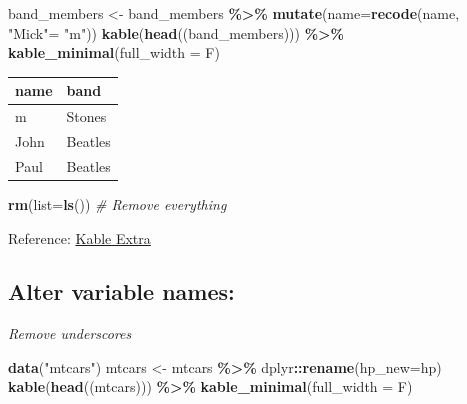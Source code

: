 \documentclass[
]{article}
\newenvironment{Shaded}{\begin{snugshade}}{\end{snugshade}}
\newcommand{\AttributeTok}[1]{\textcolor[rgb]{0.13,0.29,0.53}{#1}}
\newcommand{\CommentTok}[1]{\textcolor[rgb]{0.56,0.35,0.01}{\textit{#1}}}
\newcommand{\FunctionTok}[1]{\textcolor[rgb]{0.13,0.29,0.53}{\textbf{#1}}}
\newcommand{\NormalTok}[1]{#1}
\newcommand{\OtherTok}[1]{\textcolor[rgb]{0.56,0.35,0.01}{#1}}
\newcommand{\SpecialCharTok}[1]{\textcolor[rgb]{0.81,0.36,0.00}{\textbf{#1}}}
\newcommand{\StringTok}[1]{\textcolor[rgb]{0.31,0.60,0.02}{#1}}
\begin{document}
\begin{Shaded}
\begin{Highlighting}[]
\NormalTok{band\_members }\OtherTok{\textless{}{-}}\NormalTok{ band\_members }\SpecialCharTok{\%\textgreater{}\%} \FunctionTok{mutate}\NormalTok{(}\AttributeTok{name=}\FunctionTok{recode}\NormalTok{(name, }\StringTok{"Mick"}\OtherTok{=} \StringTok{"m"}\NormalTok{))}
\FunctionTok{kable}\NormalTok{(}\FunctionTok{head}\NormalTok{((band\_members))) }\SpecialCharTok{\%\textgreater{}\%} \FunctionTok{kable\_minimal}\NormalTok{(}\AttributeTok{full\_width =}\NormalTok{ F)}
\end{Highlighting}
\end{Shaded}

\begin{table}
\centering
\begin{tabular}{l|l}
\hline
name & band\\
\hline
m & Stones\\
\hline
John & Beatles\\
\hline
Paul & Beatles\\
\hline
\end{tabular}
\end{table}

\begin{Shaded}
\begin{Highlighting}[]
\FunctionTok{rm}\NormalTok{(}\AttributeTok{list=}\FunctionTok{ls}\NormalTok{()) }\CommentTok{\# Remove everything}
\end{Highlighting}
\end{Shaded}

Reference: \href{https://cran.r-project.org/web/packages/kableExtra/vignettes/awesome_table_in_html.html}{Kable Extra}

\hypertarget{alter-variable-names}{%
\subsection{Alter variable names:}\label{alter-variable-names}}

\emph{Remove underscores}

\begin{Shaded}
\begin{Highlighting}[]
\FunctionTok{data}\NormalTok{(}\StringTok{"mtcars"}\NormalTok{)}
\NormalTok{mtcars }\OtherTok{\textless{}{-}}\NormalTok{ mtcars }\SpecialCharTok{\%\textgreater{}\%}\NormalTok{ dplyr}\SpecialCharTok{::}\FunctionTok{rename}\NormalTok{(}\AttributeTok{hp\_new=}\NormalTok{hp)}
\FunctionTok{kable}\NormalTok{(}\FunctionTok{head}\NormalTok{((mtcars))) }\SpecialCharTok{\%\textgreater{}\%} \FunctionTok{kable\_minimal}\NormalTok{(}\AttributeTok{full\_width =}\NormalTok{ F)}
\end{Highlighting}
\end{Shaded}
\end{document}

